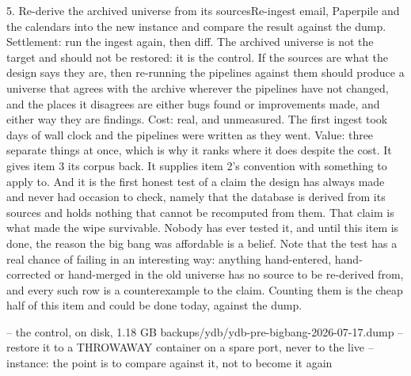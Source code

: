 \begin{Open}{5. Re-derive the archived universe from its sources}{Re-ingest email, Paperpile and the calendars into the new instance and compare the result against the dump.}
Settlement: run the ingest again, then diff. The archived universe is not the target and should not be restored: it is the control. If the sources are what the design says they are, then re-running the pipelines against them should produce a universe that agrees with the archive wherever the pipelines have not changed, and the places it disagrees are either bugs found or improvements made, and either way they are findings. Cost: real, and unmeasured. The first ingest took days of wall clock and the pipelines were written as they went. Value: three separate things at once, which is why it ranks where it does despite the cost. It gives item 3 its corpus back. It supplies item 2's convention with something to apply to. And it is the first honest test of a claim the design has always made and never had occasion to check, namely that the database is derived from its sources and holds nothing that cannot be recomputed from them. That claim is what made the wipe survivable. Nobody has ever tested it, and until this item is done, the reason the big bang was affordable is a belief. Note that the test has a real chance of failing in an interesting way: anything hand-entered, hand-corrected or hand-merged in the old universe has no source to be re-derived from, and every such row is a counterexample to the claim. Counting them is the cheap half of this item and could be done today, against the dump.
\begin{Check}
-- the control, on disk, 1.18 GB
backups/ydb/ydb-pre-bigbang-2026-07-17.dump
-- restore it to a THROWAWAY container on a spare port, never to the live
-- instance: the point is to compare against it, not to become it again
\end{Check}
\end{Open}

